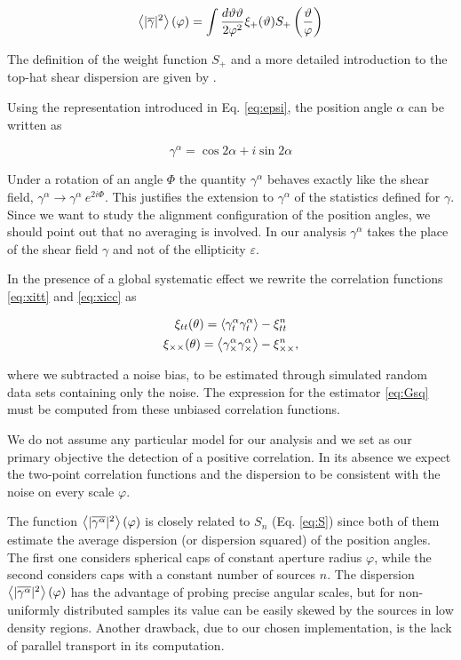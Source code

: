 		\begin{gather}
			\left\langle |\overline{\gamma}|^2 \right\rangle(\varphi) = \int \frac{d\vartheta\vartheta}{2\varphi^2} 
				\xi_+(\vartheta) S_+ \left( \frac{\vartheta}{\varphi}\right)
			\label{eq:Gsq}
		\end{gather}
		
		The definition of the weight function $S_+$ and a more detailed introduction to the top-hat shear dispersion are given by \cite{Schneider2002}.
		
		
		Using the representation introduced in Eq. \eqref{eq:epsi}, the position angle $\alpha$ can be written as
		
		\begin{equation}
			\gamma^\alpha = \cos 2\alpha + i \sin 2 \alpha
		\end{equation} 			
		
		Under a rotation of an angle $\Phi$ the quantity $\gamma^\alpha$ behaves exactly like the shear field, $\gamma^\alpha \to \gamma^\alpha~e^{2i\Phi}$. This justifies the extension to $\gamma^\alpha$ of the statistics defined for $\gamma$. Since we want to study the alignment configuration of the position angles, we should point out that no averaging is involved. In our analysis $\gamma^\alpha$ takes the place of the shear field $\gamma$ and not of the ellipticity $\varepsilon$.    
		
		In the presence of a global systematic effect we rewrite the correlation functions \eqref{eq:xitt} and \eqref{eq:xicc} as
		
		\begin{gather}
			\xi_{tt} (\theta) = \left\langle \gamma^\alpha_t \gamma^\alpha_t \right\rangle - \xi^n_{tt}
			\\
			\xi_{\times \times} (\theta) = \left\langle \gamma^\alpha_\times \gamma^\alpha_\times \right\rangle
			-
			\xi^n_{\times \times},
		\end{gather}
		
		where we subtracted a noise bias, to be estimated through simulated random data sets containing only the noise. The expression for the estimator \eqref{eq:Gsq} must be computed from these unbiased correlation functions.
		
		We do not assume any particular model for our analysis and we set as our primary objective the detection of a positive correlation. In its absence we expect the two-point correlation functions and the dispersion to be consistent with the noise on every scale $\varphi$.
		
		The function $\left\langle |\overline{\gamma^\alpha}|^2 \right\rangle(\varphi)$ is closely related to $S_n$ (Eq. \eqref{eq:S}) since both of them estimate the average dispersion (or dispersion squared) of the position angles. The first one considers spherical caps of constant aperture radius $\varphi$, while the second considers caps with a constant number of sources $n$. The dispersion $\left\langle |\overline{\gamma^\alpha}|^2 \right\rangle(\varphi)$ has the advantage of probing precise angular scales, but for non-uniformly distributed samples its value can be easily skewed by the sources in low density regions. Another drawback, due to our chosen implementation, is the lack of parallel transport in its computation.  
	
